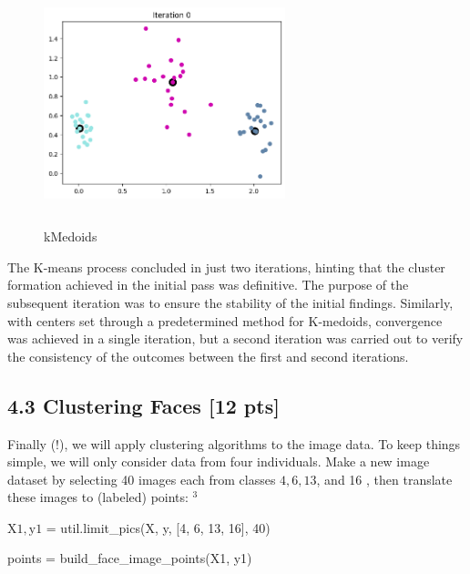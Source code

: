 \documentclass[10pt]{article}
\begin{document}
\begin{figure}[H]
  \centering
  \includegraphics[width=7cm, height=7cm]{images/4.2f_Medoids.png}
  \caption{kMedoids}
  \label{fig:Clusters}
\end{figure}

The K-means process concluded in just two iterations, hinting that the cluster formation achieved in the initial pass was definitive. The purpose of the subsequent iteration was to ensure the stability of the initial findings. Similarly, with centers set through a predetermined method for K-medoids, convergence was achieved in a single iteration, but a second iteration was carried out to verify the consistency of the outcomes between the first and second iterations. \\


\subsection*{4.3 Clustering Faces [12 pts]}
Finally (!), we will apply clustering algorithms to the image data. To keep things simple, we will only consider data from four individuals. Make a new image dataset by selecting 40 images each from classes $4,6,13$, and 16 , then translate these images to (labeled) points: ${ }^{3}$

$\mathrm{X} 1, \mathrm{y} 1$ = util.limit\_pics(X, y, [4, 6, 13, 16], 40)

points = build\_face\_image\_points(X1, y1)
\end{document}
